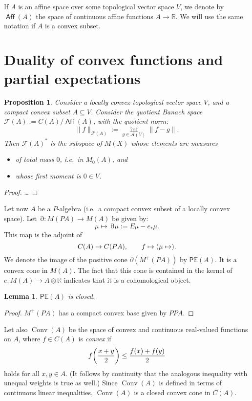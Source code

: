 \documentclass[a4paper,12pt]{scrartcl}
\numberwithin{equation}{section}
\theoremstyle{plain}
\newtheorem{lemma}[thm]{Lemma}
\newtheorem{prop}[thm]{Proposition}
\theoremstyle{definition}
\DeclareMathOperator{\Aff}{\mathsf{Aff}} %
\newcommand{\R}{\mathbb{R}}
\DeclareMathOperator{\1}{\mathbbm{1}}
\DeclareMathOperator{\2}{\mathbbm{2}}
\newcommand{\E}{\mathbb{E}}
\DeclareMathOperator{\D}{\partial}
\newcommand{\PCM}{\mathsf{P}\E} %
\let\originalleft\left
\let\originalright\right
\renewcommand{\left}{\mathopen{}\mathclose\bgroup\originalleft}
\renewcommand{\right}{\aftergroup\egroup\originalright}
\begin{document}
If $A$ is an affine space over some topological vector space $V$, we denote by $\Aff(A)$ the space of continuous affine functions $A\to\R$. We will use the same notation if $A$ is a convex subset.

\section{Duality of convex functions and partial expectations}

\begin{prop}
 Consider a locally convex topological vector space $V$, and a compact convex subset $A\subseteq V$. Consider the quotient Banach space $\mathcal{F}(A):=C(A)/\Aff(A)$, with the quotient norm:
 \begin{equation}
  \|f\|_{\mathcal{F}(A)}:=\inf_{g\in\mathcal{A}(V)} \|f-g\|.
 \end{equation}
 Then $\mathcal{F}(A)^*$ is the subspace of $M(X)$ whose elements are measures
 \begin{itemize}
  \item of total mass $0$, i.e.~in $M_0(A)$, and
  \item whose first moment is $0\in V$.
 \end{itemize}
\end{prop}

\begin{proof}
\ldots
\end{proof}

Let now $A$ be a $P$-algebra (i.e.~a compact convex subset of a locally convex space). Let $\D:M(PA)\to M(A)$ be given by:
\begin{equation}
 \mu \mapsto \D\mu := E\mu - e_*\mu .
\end{equation}
This map is the adjoint of
\[
	C(A) \to C(PA), \qquad f\mapsto \left(\mu \mapsto \right).
\]
We denote the image of the positive cone $\partial(M^+(PA))$ by $\PCM(A)$. It is a convex cone in $M(A)$. The fact that this cone is contained in the kernel of $e : M(A) \to A\otimes\R$ indicates that it is a cohomological object.

\begin{lemma}
$\PCM(A)$ is closed.
\label{PCMclosed}
\end{lemma}

\begin{proof}
$M^+(PA)$ has a compact convex base given by $PPA$.
\end{proof}

Let also $\operatorname{Conv}(A)$ be the space of convex and continuous real-valued functions on $A$, where $f\in C(A)$ is \emph{convex} if
\[
	f\left(\frac{x + y}{2}\right) \leq \frac{f(x) + f(y)}{2}	
\]
holds for all $x,y\in A$. (It follows by continuity that the analogous inequality with unequal weights is true as well.) Since $\operatorname{Conv}(A)$ is defined in terms of continuous linear inequalities, $\operatorname{Conv}(A)$ is a closed convex cone in $C(A)$.
\end{document}
